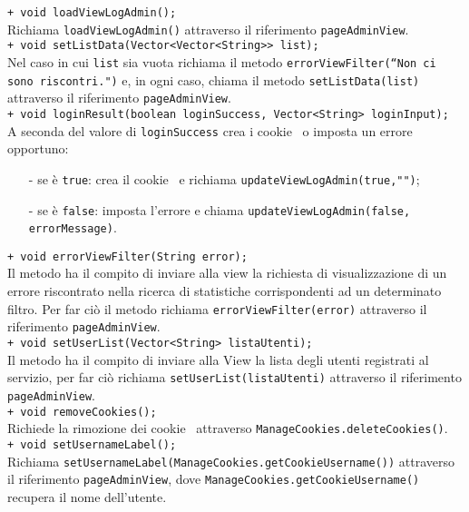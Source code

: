 {{\begin{sloppypar}
{{\begin{itemize}
					\texttt{+ void loadViewLogAdmin();}\\
					Richiama \texttt{loadViewLogAdmin()} attraverso il riferimento \texttt{pageAdminView}.\\
					
					\texttt{+ void setListData(Vector<Vector<String>> list);}\\
					Nel caso in cui \texttt{list} sia vuota richiama il metodo  \texttt{errorViewFilter(“Non ci sono riscontri.")} e, in ogni caso, chiama il metodo  \texttt{setListData(list)} attraverso il riferimento  \texttt{pageAdminView}.\\
					
					\texttt{+ void loginResult(boolean loginSuccess, Vector<String> loginInput);}\\
					A seconda del valore di \texttt{loginSuccess} crea i cookie\g~ o imposta un errore opportuno:
					\begin{itemize}
						\item[-] se è \texttt{true}: crea il cookie\g~ e richiama \texttt{updateViewLogAdmin(true,"")};
						\item[-] se è \texttt{false}: imposta l’errore e chiama \texttt{updateViewLogAdmin(false, errorMessage)}.\\
					\end{itemize}

					\texttt{+ void errorViewFilter(String error);}\\
					Il metodo ha il compito di inviare alla view la richiesta di visualizzazione di un errore riscontrato nella ricerca di statistiche corrispondenti ad un determinato filtro. Per far ciò il metodo richiama \texttt{errorViewFilter(error)} attraverso il riferimento \texttt{pageAdminView}.\\
					
					\texttt{+ void setUserList(Vector<String> listaUtenti);}\\
					Il metodo ha il compito di inviare alla View la lista degli utenti registrati al servizio, per far ciò richiama \texttt{setUserList(listaUtenti)} attraverso il riferimento \texttt{pageAdminView}.\\
					
					\texttt{+ void removeCookies();}\\
					Richiede la rimozione dei cookie\g~ attraverso \texttt{ManageCookies.deleteCookies()}.\\
					
					\texttt{+ void setUsernameLabel();}\\
					Richiama \texttt{setUsernameLabel(ManageCookies.getCookieUsername())} attraverso il riferimento \texttt{pageAdminView}, dove \texttt{ManageCookies.getCookieUsername()} recupera il nome dell’utente.\\
					

\end{itemize}}}
\end{sloppypar}}}
